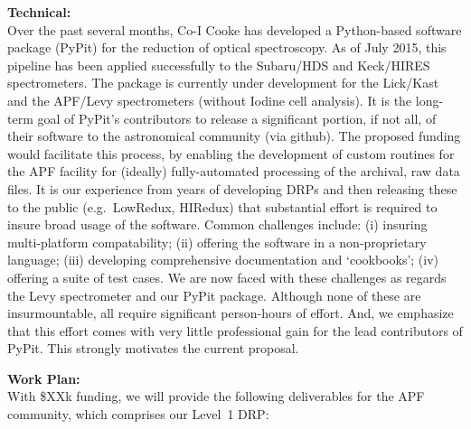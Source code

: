 \documentclass[11pt,preprint]{aastex}
\begin{document}
\noindent 
{\bf Technical:} \\
Over the past several months, Co-I Cooke has developed a Python-based
software package (PyPit) for the reduction of optical spectroscopy.
As of July 2015, this pipeline has been applied successfully to the 
Subaru/HDS and Keck/HIRES spectrometers.  The package is currently
under development for the Lick/Kast and the APF/Levy
spectrometers (without Iodine cell analysis).
It is the long-term goal of PyPit's contributors to release a
significant portion, if not all, of their software to the astronomical
community (via github).  The proposed funding would facilitate
this process, by enabling the development of custom routines
for the APF facility for (ideally) fully-automated processing
of the archival, raw data files.
%
It is our experience from years of developing DRPs and then releasing
these to the public (e.g.\ LowRedux, HIRedux) that substantial effort
is required to insure broad usage of the software.  Common
challenges include:
(i) insuring multi-platform compatability;
(ii) offering the software in a non-proprietary language;
(iii) developing comprehensive documentation and `cookbooks';
(iv) offering a suite of test cases.
We are now faced with these challenges as regards the Levy 
spectrometer and our PyPit package.  Although none of these are
insurmountable, all require significant person-hours of effort.
And, we emphasize that this effort comes with very little professional
gain for the lead contributors of PyPit.  This strongly motivates
the current proposal.

\vskip 0.2in

\noindent 
{\bf Work Plan:} \\
With \$XXk funding, we will provide the following deliverables
for the APF community, which comprises our Level~1 DRP:
\end{document}
